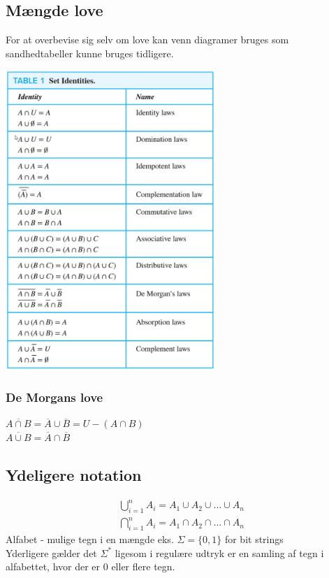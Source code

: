 \documentclass[12pt, a4paper]{article}
\begin{document}
			\subsection{Mængde love}
				For at overbevise sig selv om love kan venn diagramer bruges som sandhedtabeller kunne bruges tidligere.
				\begin{center}
					\includegraphics[width=300px]{assets/setEq.png}
				\end{center}
				\subsubsection{De Morgans love}
					$\overline{A\cap B} = \overline{A}\cup \overline{B}=U-(A\cap B)$\\
					$\overline{A\cup B} = \overline{A} \cap \overline{B}$\
			\subsection{Ydeligere notation}
				\begin{align*}
					\bigcup\limits_{i=1}^n A_i=A_1\cup A_2 \cup ... \cup A_n\\
					\bigcap\limits_{i=1}^n A_i=A_1\cap A_2 \cap ... \cap A_n
				\end{align*}
				Alfabet - mulige tegn i en mængde eks. $\Sigma = \{0,1\}$ for bit strings\\
				Yderligere gælder det $\Sigma^*$ ligesom i regulære udtryk er en samling af tegn i alfabettet, hvor der er 0 eller flere tegn.
\end{document}
